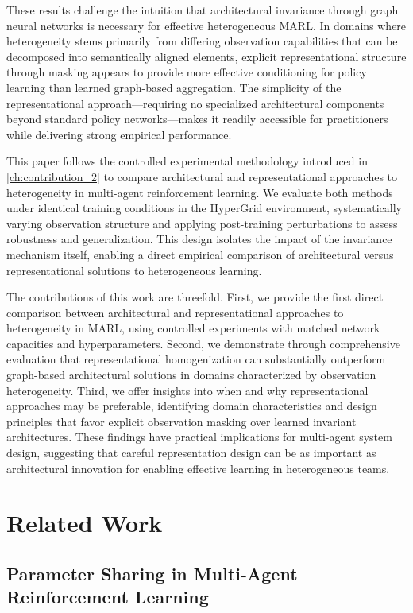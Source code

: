 These results challenge the intuition that architectural invariance 
through graph neural networks is necessary for effective heterogeneous MARL. 
In domains where heterogeneity stems primarily from differing observation 
capabilities that can be decomposed into semantically aligned elements, 
explicit representational structure through masking appears to provide 
more effective conditioning for policy learning than learned graph-based aggregation. 
The simplicity of the representational approach—requiring no specialized architectural 
components beyond standard policy networks—makes it readily accessible for 
practitioners while delivering strong empirical performance.

This paper follows the controlled experimental methodology introduced 
in \cref{ch:contribution_2}
to compare architectural and representational 
approaches to heterogeneity in multi-agent reinforcement learning. 
We evaluate both methods under identical training conditions in the 
HyperGrid environment, systematically varying observation structure and 
applying post-training perturbations to assess robustness and generalization. 
This design isolates the impact of the invariance mechanism itself, 
enabling a direct empirical comparison of architectural versus 
representational solutions to heterogeneous learning.

The contributions of this work are threefold. 
First, we provide the first direct comparison between architectural and representational 
approaches to heterogeneity in MARL, using controlled experiments with matched network 
capacities and hyperparameters. 
Second, we demonstrate through comprehensive evaluation 
that representational homogenization can substantially outperform graph-based architectural 
solutions in domains characterized by observation heterogeneity. 
Third, we offer insights into when and why representational approaches may be preferable, 
identifying domain characteristics and design principles that favor explicit 
observation masking over learned invariant architectures. 
These findings have practical implications for multi-agent system design, 
suggesting that careful representation design can be as important as architectural 
innovation for enabling effective learning in heterogeneous teams.

\section{Related Work}

\subsection{Parameter Sharing in Multi-Agent Reinforcement Learning}

